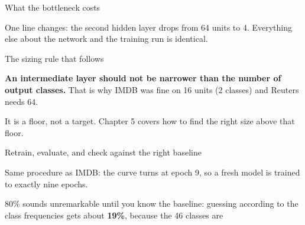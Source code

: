 \documentclass[aspectratio=169,11pt,t]{beamer}
\begin{document}
\begin{frame}[shrink=25]{What the bottleneck costs}
{\fontsize{9.4}{12.6}\selectfont\color{fg2}One line changes: the second hidden layer drops from 64 units to 4. Everything else about the network and the training run is identical.\par}\vskip 4pt
\begin{minipage}[t]{0.494\textwidth}
\end{minipage}%
\hfill
\begin{minipage}[t]{0.494\textwidth}
\end{minipage}%
\begin{iquote}
\end{iquote}
\end{frame}

\begin{frame}[shrink=25]{The sizing rule that follows}
\begin{iband}[signal]
\textbf{An intermediate layer should not be narrower than the number of output classes.} That is why IMDB was fine on 16 units (2 classes) and Reuters needs 64.
\end{iband}
{\fontsize{9.4}{12.6}\selectfont\color{fg2}It is a floor, not a target. Chapter 5 covers how to find the right size above that floor.\par}\vskip 4pt
\end{frame}

\begin{frame}[shrink=25]{Retrain, evaluate, and check against the right baseline}
{\fontsize{9.4}{12.6}\selectfont\color{fg2}Same procedure as IMDB: the curve turns at epoch 9, so a fresh model is trained to exactly nine epochs.\par}\vskip 4pt
\begin{iband}[signal]
80\% sounds unremarkable until you know the baseline: guessing according to the class frequencies gets about \textbf{19\%}, because the 46 classes are 
\end{iband}
\end{frame}
\end{document}
